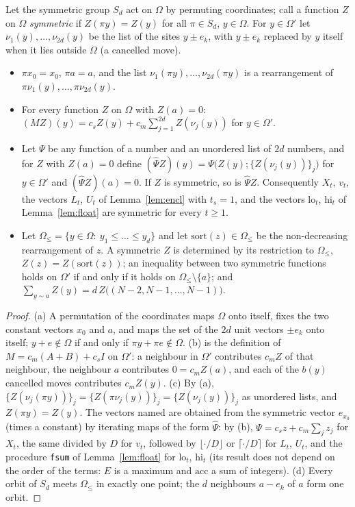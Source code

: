 \begin{lemma}\label{lem:sym}
Let the symmetric group $S_d$ act on $\Omega$ by permuting coordinates; call a function $Z$ on $\Omega$ \emph{symmetric} if $Z(\pi y)=Z(y)$ for all $\pi\in S_d$, $y\in\Omega$. For $y\in\Omega'$ let $\nu_1(y),\dots,\nu_{2d}(y)$ be the list of the sites $y\pm e_k$, with $y\pm e_k$ replaced by $y$ itself when it lies outside $\Omega$ (a cancelled move).
\begin{itemize}
\item[(a)] $\pi x_0=x_0$, $\pi a=a$, and the list $\nu_1(\pi y),\dots,\nu_{2d}(\pi y)$ is a rearrangement of $\pi\nu_1(y),\dots,\pi\nu_{2d}(y)$.
\item[(b)] For every function $Z$ on $\Omega$ with $Z(a)=0$: $(MZ)(y)=c_sZ(y)+c_m\sum_{j=1}^{2d}Z(\nu_j(y))$ for $y\in\Omega'$.
\item[(c)] Let $\Psi$ be any function of a number and an unordered list of $2d$ numbers, and for $Z$ with $Z(a)=0$ define $(\widehat\Psi Z)(y)=\Psi\bigl(Z(y);\{Z(\nu_j(y))\}_{j}\bigr)$ for $y\in\Omega'$ and $(\widehat\Psi Z)(a)=0$. If $Z$ is symmetric, so is $\widehat\Psi Z$. Consequently $X_t$, $v_t$, the vectors $L_t$, $U_t$ of Lemma~\ref{lem:encl} with $t_s=1$, and the vectors $\mathrm{lo}_t$, $\mathrm{hi}_t$ of Lemma~\ref{lem:float} are symmetric for every $t\ge1$.
\item[(d)] Let $\Omega_\le=\{y\in\Omega:\ y_1\le\dots\le y_d\}$ and let $\mathrm{sort}(z)\in\Omega_\le$ be the non-decreasing rearrangement of $z$. A symmetric $Z$ is determined by its restriction to $\Omega_\le$, $Z(z)=Z(\mathrm{sort}(z))$; an inequality between two symmetric functions holds on $\Omega'$ if and only if it holds on $\Omega_\le\setminus\{a\}$; and $\sum_{y\sim a}Z(y)=d\,Z\bigl((N-2,N-1,\dots,N-1)\bigr)$.
\end{itemize}
\end{lemma}
\begin{proof}
(a) A permutation of the coordinates maps $\Omega$ onto itself, fixes the two constant vectors $x_0$ and $a$, and maps the set of the $2d$ unit vectors $\pm e_k$ onto itself; $y+e\notin\Omega$ if and only if $\pi y+\pi e\notin\Omega$. (b) is the definition of $M=c_m(A+B)+c_sI$ on $\Omega'$: a neighbour in $\Omega'$ contributes $c_mZ$ of that neighbour, the neighbour $a$ contributes $0=c_mZ(a)$, and each of the $b(y)$ cancelled moves contributes $c_mZ(y)$. (c) By (a), $\{Z(\nu_j(\pi y))\}_j=\{Z(\pi\nu_j(y))\}_j=\{Z(\nu_j(y))\}_j$ as unordered lists, and $Z(\pi y)=Z(y)$. The vectors named are obtained from the symmetric vector $e_{x_0}$ (times a constant) by iterating maps of the form $\widehat\Psi$: by (b), $\Psi=c_sz+c_m\sum_jz_j$ for $X_t$, the same divided by $D$ for $v_t$, followed by $\lfloor\cdot/D\rfloor$ or $\lceil\cdot/D\rceil$ for $L_t$, $U_t$, and the procedure \texttt{fsum} of Lemma~\ref{lem:float} for $\mathrm{lo}_t$, $\mathrm{hi}_t$ (its result does not depend on the order of the terms: $E$ is a maximum and $\mathrm{acc}$ a sum of integers). (d) Every orbit of $S_d$ meets $\Omega_\le$ in exactly one point; the $d$ neighbours $a-e_k$ of $a$ form one orbit.
\end{proof}

